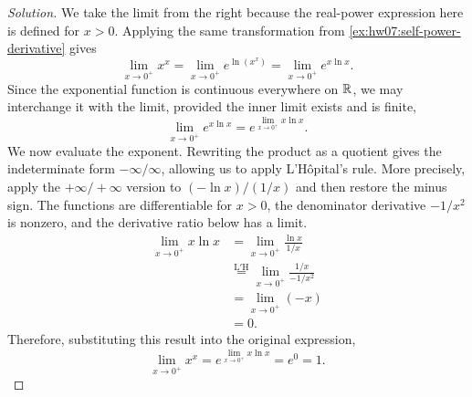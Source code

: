 \begin{proof}[Solution]
  We take the limit from the right because the
  real-power expression here is defined for $x>0$.
  Applying the same transformation from
  \autoref{ex:hw07:self-power-derivative} gives
  \[
    \lim_{x\to0^+}x^x
      =\lim_{x\to0^+}e^{\ln(x^x)}
      =\lim_{x\to0^+}e^{x\ln x}.
  \]
  Since the exponential function is continuous everywhere on $\mathbb{R}$,
  we may interchange it with the limit, provided the inner limit
  exists and is finite,
  \[
    \lim_{x\to0^+}e^{x\ln x}
      =e^{\lim_{x\to0^+}x\ln x}.
  \]
  We now evaluate the exponent. Rewriting the product as a quotient
  gives the indeterminate form $-\infty/\infty$, allowing us to
  apply L'H\^opital's rule.
  More precisely, apply the $+\infty/+\infty$
  version to $(-\ln x)/(1/x)$ and then restore the minus sign.
  The functions are differentiable for $x>0$, the denominator
  derivative $-1/x^2$ is nonzero, and the derivative ratio below
  has a limit.
  \[
    \begin{aligned}
      \lim_{x\to0^+}x\ln x
        &=\lim_{x\to0^+}\frac{\ln x}{1/x}\\
        &\overset{\mathrm{L'H}}{=}
          \lim_{x\to0^+}\frac{1/x}{-1/x^2}\\
        &=\lim_{x\to0^+}(-x)\\
        &=0.
    \end{aligned}
  \]
  Therefore, substituting this result into the original expression,
  \[
    \lim_{x\to0^+}x^x
      =e^{\lim_{x\to0^+}x\ln x}=e^0=1.
  \]
\end{proof}
